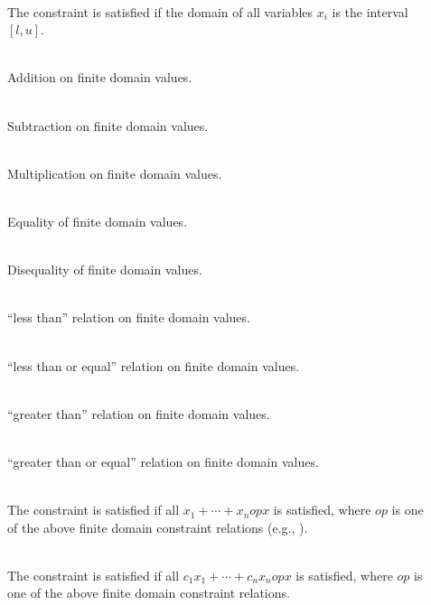 {\begin{description}
\item[]~\\
The constraint 
is satisfied if the domain of all variables $x_i$ is the interval $[l,u]$.
\item[]~\\
Addition on finite domain values.
\item[]~\\
Subtraction on finite domain values.
\item[]~\\
Multiplication on finite domain values.
\item[]~\\
Equality of finite domain values.
\item[]~\\
Disequality of finite domain values.
\item[]~\\
``less than'' relation on finite domain values.
\item[]~\\
``less than or equal'' relation on finite domain values.
\item[]~\\
``greater than'' relation on finite domain values.
\item[]~\\
``greater than or equal'' relation on finite domain values.
\item[]~\\
The constraint 
is satisfied if all $x_1+\cdots + x_n \mathrel{op} x$ is satisfied,
where $op$ is one of the above finite domain constraint relations
(e.g., \ccode{=\#}).
\item[]~\\
The constraint 
is satisfied if all $c_1 x_1+\cdots + c_n x_n \mathrel{op} x$ is satisfied,
where $op$ is one of the above finite domain constraint relations.

\end{description}}
